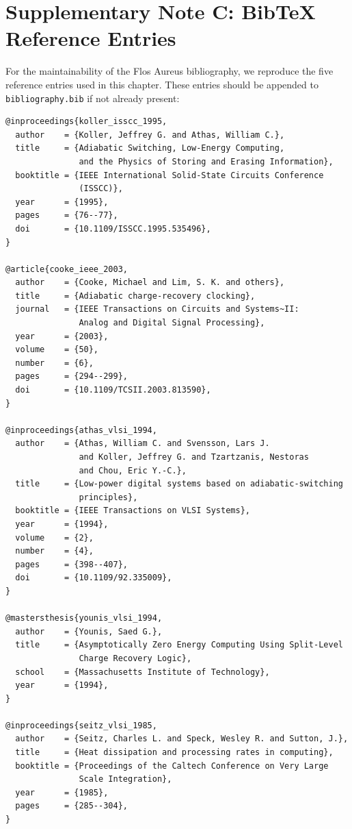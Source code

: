 
\section*{Supplementary Note C: BibTeX Reference Entries}
\label{sec:supp-c-w46}

For the maintainability of the Flos Aureus bibliography, we reproduce the
five reference entries used in this chapter.
These entries should be appended to \texttt{bibliography.bib} if not already
present:

\begin{verbatim}
@inproceedings{koller_isscc_1995,
  author    = {Koller, Jeffrey G. and Athas, William C.},
  title     = {Adiabatic Switching, Low-Energy Computing,
               and the Physics of Storing and Erasing Information},
  booktitle = {IEEE International Solid-State Circuits Conference
               (ISSCC)},
  year      = {1995},
  pages     = {76--77},
  doi       = {10.1109/ISSCC.1995.535496},
}

@article{cooke_ieee_2003,
  author    = {Cooke, Michael and Lim, S. K. and others},
  title     = {Adiabatic charge-recovery clocking},
  journal   = {IEEE Transactions on Circuits and Systems~II:
               Analog and Digital Signal Processing},
  year      = {2003},
  volume    = {50},
  number    = {6},
  pages     = {294--299},
  doi       = {10.1109/TCSII.2003.813590},
}

@inproceedings{athas_vlsi_1994,
  author    = {Athas, William C. and Svensson, Lars J.
               and Koller, Jeffrey G. and Tzartzanis, Nestoras
               and Chou, Eric Y.-C.},
  title     = {Low-power digital systems based on adiabatic-switching
               principles},
  booktitle = {IEEE Transactions on VLSI Systems},
  year      = {1994},
  volume    = {2},
  number    = {4},
  pages     = {398--407},
  doi       = {10.1109/92.335009},
}

@mastersthesis{younis_vlsi_1994,
  author    = {Younis, Saed G.},
  title     = {Asymptotically Zero Energy Computing Using Split-Level
               Charge Recovery Logic},
  school    = {Massachusetts Institute of Technology},
  year      = {1994},
}

@inproceedings{seitz_vlsi_1985,
  author    = {Seitz, Charles L. and Speck, Wesley R. and Sutton, J.},
  title     = {Heat dissipation and processing rates in computing},
  booktitle = {Proceedings of the Caltech Conference on Very Large
               Scale Integration},
  year      = {1985},
  pages     = {285--304},
}
\end{verbatim}

